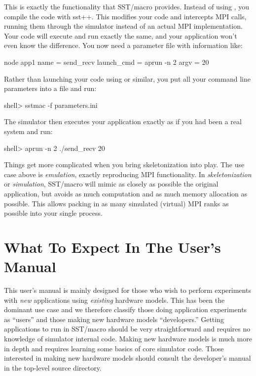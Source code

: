 This is exactly the functionality that SST/macro provides.
Instead of using , you compile the code with {sst++}.
This modifies your code and intercepts MPI calls, running them through the simulator instead of an actual MPI implementation.
Your code will execute and run exactly the same, and your application won't even know the difference.
You now need a parameter file with information like:

\begin{ViFile}
node {
 app1 {
  name = send_recv
  launch_cmd = aprun -n 2
  argv = 20
 }
}
\end{ViFile}
Rather than launching your code using  or similar, you put all your command line parameters into a  file and run:

\begin{ShellCmd}
shell> sstmac -f parameters.ini
\end{ShellCmd}
The simulator then executes your application exactly as if you had been a real system and run:

\begin{ShellCmd}
shell> aprun -n 2 ./send_recv 20
\end{ShellCmd}
Things get more complicated when you bring skeletonization into play.
The use case above is \emph{emulation}, exactly reproducing MPI functionality.
In \emph{skeletonization} or \emph{simulation}, SST/macro will mimic as closely as possible the original application,
but avoids as much computation and as much memory allocation as possible.
This allows packing in as many simulated (virtual) MPI ranks as possible into your single  process.

\section{What To Expect In The User's Manual}
This user's manual is mainly designed for those who wish to perform experiments with \emph{new} applications using \emph{existing} hardware models.
This has been the dominant use case and we therefore classify those doing application experiments as ``users'' and those making new hardware models ``developers.''
Getting applications to run in SST/macro should be very straightforward and requires no knowledge of simulator internal code.
Making new hardware models is much more in depth and requires learning some basics of core simulator code.
Those interested in making new hardware models should consult the developer's manual in the top-level source directory.
